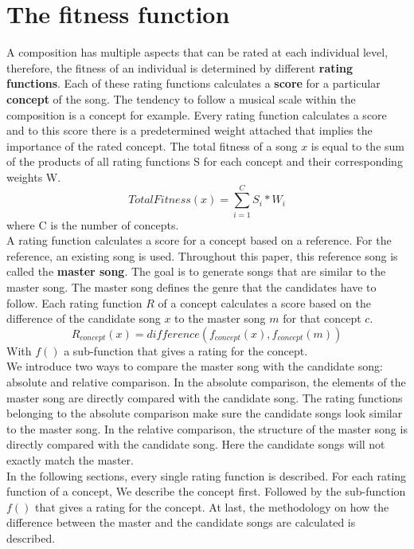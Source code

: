 
\section{The fitness function}
A composition has multiple aspects that can be rated at each individual level, therefore, the fitness of an individual is determined by different \textbf{rating functions}. Each of these rating functions calculates a \textbf{score} for a particular \textbf{concept} of the song. The tendency to follow a musical scale within the composition is a concept for example. Every rating function calculates a score and to this score there is a predetermined weight attached that implies the importance of the rated concept. The total fitness of a song $x$ is equal to the sum of the products of all rating functions S for each concept and their corresponding weights W.
\[ TotalFitness(x) = \sum_{i=1}^{C} S_{i} * W_{i}\] 
where C is the number of concepts.
\\
A rating function calculates a score for a concept based on a reference. For the reference, an existing song is used. Throughout this paper, this reference song is called the \textbf{master song}. The goal is to generate songs that are similar to the master song. The master song defines the genre that the candidates have to follow. Each rating function $R$ of a concept calculates a score based on the difference of the candidate song $x$ to the master song $m$ for that concept $c$. 
\[ R_{concept}(x) =  difference(f_{concept}(x),f_{concept}(m)) \]
With $f()$ a sub-function that gives a rating for the concept.
\\
We introduce two ways to compare the master song with the candidate song: absolute and relative comparison. In the absolute comparison, the elements of the master song are directly compared with the candidate song. The rating functions belonging to the absolute comparison make sure the candidate songs look similar to the master song. In the relative comparison, the structure of the master song is directly compared with the candidate song. Here the candidate songs will not exactly match the master. 
\\
In the following sections, every single rating function is described. For each rating function of a concept, We describe the concept first. Followed by the sub-function $f()$ that gives a rating for the concept. At last, the methodology on how the difference between the master and the candidate songs are calculated is described.

